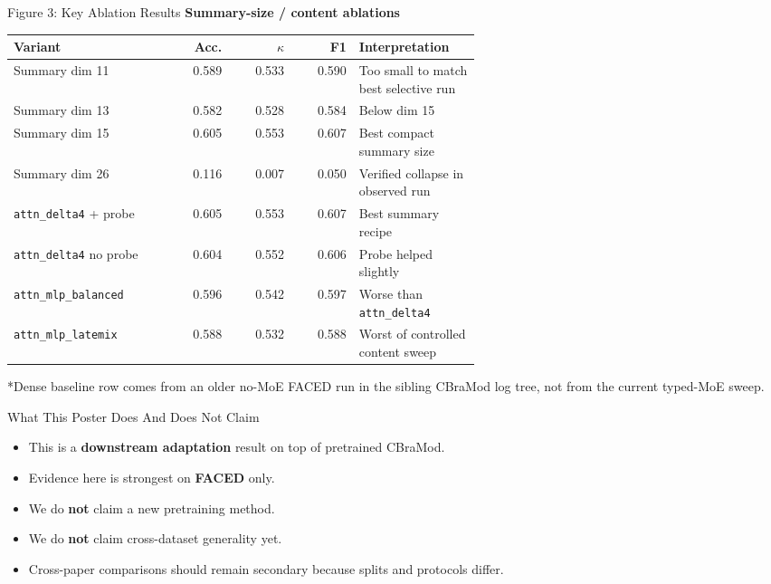 \documentclass[final]{beamer}
\newlength{\colwidth}
\begin{document}
\begin{frame}[t]
\begin{columns}[t]
\begin{column}{\colwidth}
\begin{block}{Figure 3: Key Ablation Results}
    \vspace{0.45cm}
    \textbf{Summary-size / content ablations}

    \vspace{0.15cm}
    \begin{tabular}{p{0.34\linewidth} r r r p{0.26\linewidth}}
      \toprule
      \textbf{Variant} & \textbf{Acc.} & \textbf{$\kappa$} & \textbf{F1} & \textbf{Interpretation} \\
      \midrule
      Summary dim 11 & 0.589 & 0.533 & 0.590 & Too small to match best selective run \\
      Summary dim 13 & 0.582 & 0.528 & 0.584 & Below dim 15 \\
      Summary dim 15 & 0.605 & 0.553 & 0.607 & Best compact summary size \\
      Summary dim 26 & 0.116 & 0.007 & 0.050 & Verified collapse in observed run \\
      \texttt{attn\_delta4} + probe & 0.605 & 0.553 & 0.607 & Best summary recipe \\
      \texttt{attn\_delta4} no probe & 0.604 & 0.552 & 0.606 & Probe helped slightly \\
      \texttt{attn\_mlp\_balanced} & 0.596 & 0.542 & 0.597 & Worse than \texttt{attn\_delta4} \\
      \texttt{attn\_mlp\_latemix} & 0.588 & 0.532 & 0.588 & Worst of controlled content sweep \\
      \bottomrule
    \end{tabular}

    \vspace{0.25cm}
    *Dense baseline row comes from an older no-MoE FACED run in the sibling
    CBraMod log tree, not from the current typed-MoE sweep.
  \end{block}

  \begin{alertblock}{What This Poster Does And Does Not Claim}
    \small
    \begin{itemize}
      \item This is a \textbf{downstream adaptation} result on top of pretrained
      CBraMod.
      \item Evidence here is strongest on \textbf{FACED} only.
      \item We do \textbf{not} claim a new pretraining method.
      \item We do \textbf{not} claim cross-dataset generality yet.
      \item Cross-paper comparisons should remain secondary because splits and
      protocols differ.
    \end{itemize}
  \end{alertblock}


\end{column}
\end{columns}
\end{frame}
\end{document}
